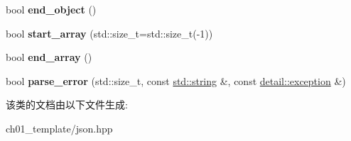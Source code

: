 \begin{DoxyCompactItemize}
\item 
\mbox{\label{classnlohmann_1_1detail_1_1json__sax__acceptor_a919645fd1827a561a994d70a435e3f19}} 
bool {\bfseries end\+\_\+object} ()
\item 
\mbox{\label{classnlohmann_1_1detail_1_1json__sax__acceptor_a8238e8090cbb4ed8a22cbc97bfb833a5}} 
bool {\bfseries start\+\_\+array} (std\+::size\+\_\+t=std\+::size\+\_\+t(-\/1))
\item 
\mbox{\label{classnlohmann_1_1detail_1_1json__sax__acceptor_a22ef94ca5476a9563dcaca15b7d6e654}} 
bool {\bfseries end\+\_\+array} ()
\item 
\mbox{\label{classnlohmann_1_1detail_1_1json__sax__acceptor_a95bb3e8b6feaa523ecda8106fb5e38e3}} 
bool {\bfseries parse\+\_\+error} (std\+::size\+\_\+t, const \mbox{\hyperlink{namespacenlohmann_1_1detail_a1ed8fc6239da25abcaf681d30ace4985ab45cffe084dd3d20d928bee85e7b0f21}{std\+::string}} \&, const \mbox{\hyperlink{classnlohmann_1_1detail_1_1exception}{detail\+::exception}} \&)
\end{DoxyCompactItemize}


该类的文档由以下文件生成\+:\begin{DoxyCompactItemize}
\item 
ch01\+\_\+template/json.\+hpp\end{DoxyCompactItemize}
